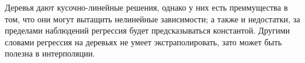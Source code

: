 \documentclass[a4paper, oneside]{book}
\begin{document}
Деревья дают кусочно-линейные решения, однако у них есть преимущества в том,
что они могут вытащить нелинейные зависимости; а также и недостатки, за
пределами наблюдений регрессия будет предсказываться константой. Другими
словами регрессия на деревьях не умеет экстраполировать, зато может быть
полезна в интерполяции.

\medskip
\printbibliography
\end{document}
